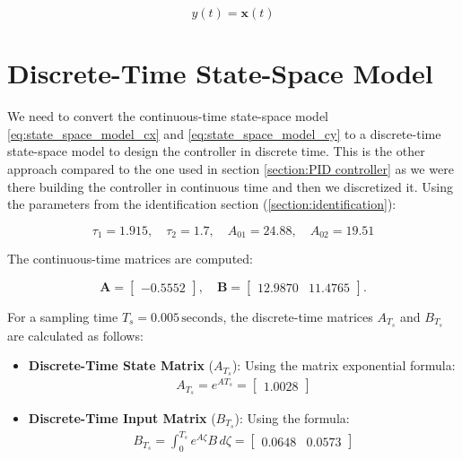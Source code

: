 \begin{equation}
    y(t) = \mathbf{x}(t)
    \label{eq:state_space_model_cy}
\end{equation}

\section{Discrete-Time State-Space Model}
We need to convert the continuous-time state-space model \eqref{eq:state_space_model_cx} and 
\eqref{eq:state_space_model_cy} to a discrete-time state-space model to design the controller in discrete time. This is
the other approach compared to the one used in section \ref{section:PID controller} as we were there building the 
controller in continuous time and then we discretized it. Using the parameters from the identification 
section (\ref{section:identification}):

\[
\tau_1 = 1.915, \quad \tau_2 = 1.7, \quad A_{01} = 24.88, \quad A_{02} = 19.51
\]

The continuous-time matrices are computed:

\[
\mathbf{A} = 
\begin{bmatrix}
-0.5552
\end{bmatrix}, \quad 
\mathbf{B} = 
\begin{bmatrix}
12.9870 & 11.4765
\end{bmatrix}.
\]

For a sampling time \( T_s = 0.005 \, \text{seconds} \), the discrete-time matrices \( A_{T_s} \) and \( B_{T_s} \) are calculated as follows:

\begin{itemize}
    \item \textbf{Discrete-Time State Matrix} (\(A_{T_s}\)): 
   Using the matrix exponential formula:
   \begin{gather*}
        A_{T_s} = e^{A T_s} = \begin{bmatrix} 1.0028 \end{bmatrix}    
   \end{gather*}
   

\end{itemize}


\begin{itemize} 
    \item \textbf{Discrete-Time Input Matrix} (\(B_{T_s}\)): 
   Using the formula:
   \begin{gather*}
    B_{T_s} = \int_0^{T_s} e^{A \zeta} B \, d\zeta = \begin{bmatrix} 0.0648 & 0.0573\end{bmatrix}    
   \end{gather*}
   
\end{itemize}

